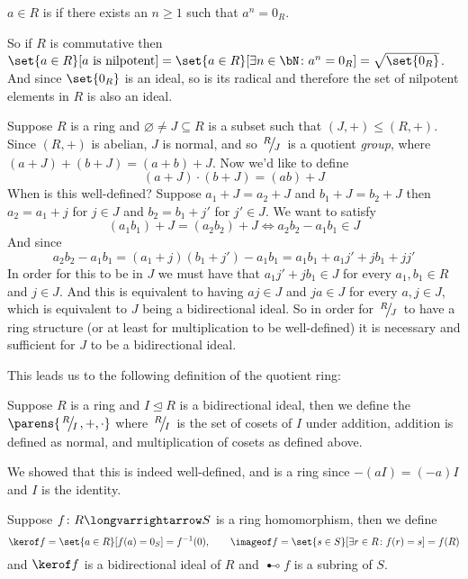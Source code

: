 \documentclass[10pt]{article}
\def\slfrac#1#2{\left.{}^{#1}\mkern-4mu\middle/\mkern-3mu{}_{#2}\right.}
\let\ideal=\trianglelefteq
\begin{document}
\begin{defn*}

    $a\in R$ is  if there exists an $n\geq1$ such that $a^n=0_R$.

\end{defn*}

So if $R$ is commutative then $\set{a\in R}[a\text{ is nilpotent}]=\set{a\in R}[\exists n\in\bN\colon a^n=0_R]=\sqrt{\set{0_R}}$.
And since $\set{0_R}$ is an ideal, so is its radical and therefore the set of nilpotent elements in $R$ is also an ideal.

Suppose $R$ is a ring and $\varnothing\neq J\subseteq R$ is a subset such that $(J,+)\leq(R,+)$.
Since $(R,+)$ is abelian, $J$ is normal, and so $\slfrac RJ$ is a quotient \emph{group}, where $(a+J)+(b+J)=(a+b)+J$.
Now we'd like to define
\[ (a+J)\cdot(b+J) = (ab)+J \]
When is this well-defined?
Suppose $a_1+J=a_2+J$ and $b_1+J=b_2+J$ then $a_2=a_1+j$ for $j\in J$ and $b_2=b_1+j'$ for $j'\in J$.
We want to satisfy
\[ (a_1b_1)+J = (a_2b_2)+J \iff a_2b_2-a_1b_1\in J \]
And since
\[ a_2b_2 - a_1b_1 = (a_1+j)(b_1+j') - a_1b_1 = a_1b_1 + a_1j' + jb_1 + jj' \]
In order for this to be in $J$ we must have that $a_1j'+jb_1\in J$ for every $a_1,b_1\in R$ and $j\in J$.
And this is equivalent to having $aj\in J$ and $ja\in J$ for every $a,j\in J$, which is equivalent to $J$ being a bidirectional ideal.
So in order for $\slfrac RJ$ to have a ring structure (or at least for multiplication to be well-defined) it is necessary and sufficient for $J$ to be a bidirectional ideal.

This leads us to the following definition of the quotient ring:
\begin{defn*}

    Suppose $R$ is a ring and $I\ideal R$ is a bidirectional ideal, then we define the  $\parens{\slfrac RI, +, \cdot}$ where $\slfrac RI$ is the set of cosets of $I$ under addition,
    addition is defined as normal, and multiplication of cosets as defined above.

\end{defn*}

We showed that this is indeed well-defined, and is a ring since $-(aI)=(-a)I$ and $I$ is the identity.

\begin{prop*}

    Suppose $f\colon R\longvarrightarrow S$ is a ring homomorphism, then we define
    \[ \kerof f = \set{a\in R}[f(a)=0_S]=f^{-1}(0),\qquad \imageof f = \set{s\in S}[\exists r\in R\colon f(r)=s] = f(R) \]
    and $\kerof f$ is a bidirectional ideal of $R$ and $\imageof f$ is a subring of $S$.

\end{prop*}
\end{document}
